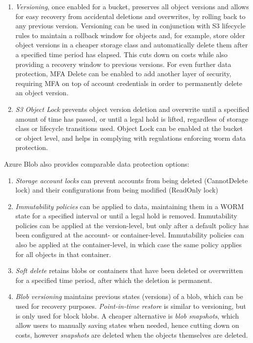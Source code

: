 \begin{enumerate}
    \item \textit{Versioning}, once enabled for a bucket, preserves all object versions and allows for easy recovery from accidental deletions and overwrites, by rolling back to any previous version. Versioning can be used in conjunction with S3 lifecycle rules to maintain a rollback window for objects and, for example, store older object versions in a cheaper storage class and automatically delete them after a specified time period has elapsed. This cuts down on costs while also providing a recovery window to previous versions. For even further data protection, MFA Delete can be enabled to add another layer of security, requiring MFA on top of account credentials in order to permanently delete an object version.

    \item \textit{S3 Object Lock} prevents object version deletion and overwrite until a specified amount of time has passed, or until a legal hold is lifted, regardless of storage class or lifecycle transitions used. Object Lock can be enabled at the bucket or object level, and helps in complying with regulations enforcing  \ac{worm} data protection.
\end{enumerate}


Azure Blob also provides comparable data protection options: ~\cite{blob_data_protection}

\begin{enumerate}
    \item \textit{Storage account locks} can prevent accounts from being deleted (CannotDelete lock)  and their configurations from being modified (ReadOnly lock)

    \item \textit{Immutability policies} can be applied to data, maintaining them in a WORM state for a specified interval or until a legal hold is removed. Immutability policies can be applied at the version-level, but only after a default policy has been configured at the account- or container-level. Immutability policies can also be applied at the container-level, in which case the same policy applies for all objects in that container.

    \item \textit{Soft delete} retains blobs or containers that have been deleted or overwritten for a specified time period, after which the deletion is permanent.

    \item \textit{Blob versioning} maintains previous states (versions) of a blob, which can be used for recovery purposes.  \textit{Point-in-time restore} is similar to versioning, but is only used for block blobs. A cheaper alternative is \textit{blob snapshots}, which allow users to manually saving states when needed, hence cutting down on costs, however \textit{snapshots }are deleted when the objects themselves are deleted.
\end{enumerate}

